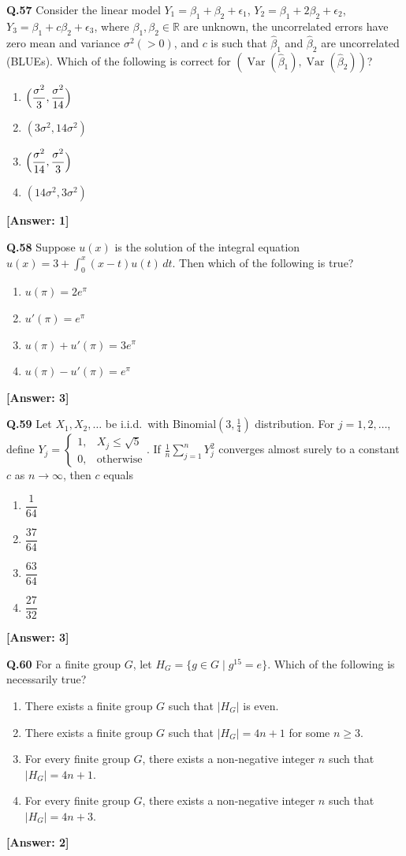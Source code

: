 \documentclass[12pt,a4paper]{article}
\newcommand{\ans}[1]{\quad\textcolor{anscolor}{\textbf{[Answer: #1]}}}
\begin{document}
\textbf{Q.57} Consider the linear model $Y_1=\beta_1+\beta_2+\epsilon_1$, $Y_2=\beta_1+2\beta_2+\epsilon_2$, $Y_3=\beta_1+c\beta_2+\epsilon_3$, where $\beta_1,\beta_2\in\mathbb{R}$ are unknown, the uncorrelated errors have zero mean and variance $\sigma^2(>0)$, and $c$ is such that $\hat{\beta}_1$ and $\hat{\beta}_2$ are uncorrelated (BLUEs). Which of the following is correct for $(\operatorname{Var}(\hat{\beta}_1),\operatorname{Var}(\hat{\beta}_2))$?
\begin{enumerate}[label=\arabic*.]
\item $\Bigl(\dfrac{\sigma^2}{3},\dfrac{\sigma^2}{14}\Bigr)$ \item $(3\sigma^2,14\sigma^2)$
\item $\Bigl(\dfrac{\sigma^2}{14},\dfrac{\sigma^2}{3}\Bigr)$ \item $(14\sigma^2,3\sigma^2)$
\end{enumerate}\ans{1}

\textbf{Q.58} Suppose $u(x)$ is the solution of the integral equation $u(x)=3+\int_0^x(x-t)u(t)\,dt$. Then which of the following is true?
\begin{enumerate}[label=\arabic*.]
\item $u(\pi)=2e^\pi$ \item $u'(\pi)=e^\pi$
\item $u(\pi)+u'(\pi)=3e^\pi$ \item $u(\pi)-u'(\pi)=e^\pi$
\end{enumerate}\ans{3}

\textbf{Q.59} Let $X_1,X_2,\ldots$ be i.i.d.\ with Binomial$(3,\tfrac{1}{4})$ distribution. For $j=1,2,\ldots$, define $Y_j=\begin{cases}1,&X_j\le\sqrt{5}\\0,&\text{otherwise}\end{cases}$. If $\tfrac{1}{n}\sum_{j=1}^nY_j^2$ converges almost surely to a constant $c$ as $n\to\infty$, then $c$ equals
\begin{enumerate}[label=\arabic*.]
\item $\dfrac{1}{64}$ \item $\dfrac{37}{64}$ \item $\dfrac{63}{64}$ \item $\dfrac{27}{32}$
\end{enumerate}\ans{3}

\textbf{Q.60} For a finite group $G$, let $H_G=\{g\in G\mid g^{15}=e\}$. Which of the following is necessarily true?
\begin{enumerate}[label=\arabic*.]
\item There exists a finite group $G$ such that $|H_G|$ is even.
\item There exists a finite group $G$ such that $|H_G|=4n+1$ for some $n\ge3$.
\item For every finite group $G$, there exists a non-negative integer $n$ such that $|H_G|=4n+1$.
\item For every finite group $G$, there exists a non-negative integer $n$ such that $|H_G|=4n+3$.
\end{enumerate}\ans{2}
\end{document}
